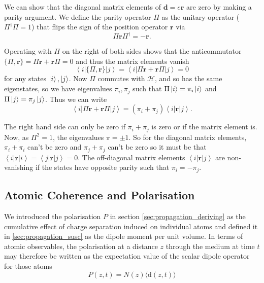    We can show that the diagonal matrix elements of $\mathbf{d} = e\mathbf{r}$
    are zero by making a parity argument. We define the parity operator $\Pi$ as
    the unitary operator (\ie $\Pi^\dagger\Pi = 1$) that flips the sign of the
    position operator $\mathbf{r}$ via
    \begin{equation}
      \Pi \mathbf{r} \Pi^\dagger = -\mathbf{r}.
    \end{equation}

    Operating with $\Pi$ on the right of both sides shows that the anticommutator
    $\{ \Pi, \mathbf{r} \} = \Pi \mathbf{r} + \mathbf{r} \Pi = 0$ and thus the
    matrix elements vanish
    \begin{equation}
      \left< i \right| \{ \Pi, \mathbf{r} \} \left| j \right> = 
      \left< i \right| \Pi \mathbf{r} + \mathbf{r} \Pi \left| j \right> = 0 
    \end{equation}
    for any states $\Ket{i}, \Ket{j}$. Now $\Pi$ commutes with $\mathcal{H}$,
    and so has the same eigenstates, so we have eigenvalues $\pi_i, \pi_j$ such
    that $\Pi \Ket{i} = \pi_i \Ket{i}$ and $\Pi \Ket{j} = \pi_j \Ket{j}$. Thus
    we can write
    \begin{equation}
      \left< i \right| \Pi \mathbf{r} + \mathbf{r} \Pi \left| j \right> = 
      (\pi_i + \pi_j) \left< i \right|  \mathbf{r} \left| j \right>.
    \end{equation}

    The right hand side can only be zero if $\pi_i + \pi_j$ is zero or if the
    matrix element is. Now, as $\Pi^2 = 1$, the eigenvalues $\pi = \pm1$. So for
    the diagonal matrix elements, $\pi_i + \pi_i$ can't be zero and $\pi_j +
    \pi_j$ can't be zero so it must be that $\left< i \right|\mathbf{r} \left| i
    \right> = \left< j \right|\mathbf{r} \left| j \right> = 0$. The off-diagonal
    matrix elements $\left< i \right|\mathbf{r} \left| j \right>$ are 
    non-vanishing if the states have opposite parity such that $\pi_i =
    -\pi_j$\cite{Steck2007}.

  \subsection{Atomic Coherence and Polarisation}

    We introduced the polarisation $P$ in section \ref{sec:propagation_deriving}
    as the cumulative effect of charge separation induced on individual atoms
    and defined it in \ref{sec:propagation_susc} as the dipole moment per unit
    volume.  In terms of atomic observables, the polarisation at a distance $z$
    through the medium at time $t$ may therefore be written as the expectation
    value of the scalar dipole operator for those atoms
    \begin{equation}
      P(z,t) = N(z) \langle \mathrm{d}(z,t) \rangle
    \end{equation}

